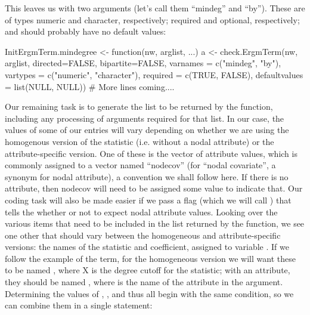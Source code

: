 \documentclass[nojss]{jss}
\begin{document}
 This leaves us with two arguments (let's call them ``mindeg'' and ``by''). These are of types numeric and character, respectively; required and optional, respectively; and should probably have no default values:

\begin{CodeChunk}
\begin{CodeInput}
InitErgmTerm.mindegree <- function(nw, arglist, ...) {
  a <- check.ErgmTerm(nw, arglist, directed=FALSE, bipartite=FALSE,
          varnames = c("mindeg", "by"),
          vartypes = c("numeric", "character"),
          required = c(TRUE, FALSE),
          defaultvalues = list(NULL, NULL))
  # More lines coming....
}
\end{CodeInput}
\end{CodeChunk}

Our remaining task is to generate the list to be returned by the function, including any processing of arguments required for that list. In our case, the values of some of our entries will vary depending on whether we are using the homogenous version of the statistic (i.e. without a nodal attribute) or the attribute-specific version.  One of these is the vector of attribute values, which is commonly assigned to a vector named ``nodecov'' (for ``nodal covariate'', a synonym for nodal attribute), a convention we shall follow here. If there is no attribute, then nodecov will need to be assigned some value to indicate that.  Our  coding task will also be made easier if we pass a flag (which we will call ) that tells the  whether or not to expect nodal attribute values. Looking over the various items that need to be included in the list returned by the function, we see one other that should vary between the homogeneous and attribute-specific versions: the names of the statistic and coefficient, assigned to variable . If we follow the example of the  term, for the homogeneous version we will want these to be named , where X is the degree cutoff for the statistic; with an attribute, they should be named , where  is the name of the attribute in the  argument. Determining the values of , , and   thus all begin with the same condition, so we can combine them in a single  statement:

\begin{CodeChunk}
\end{CodeChunk}
\end{document}
